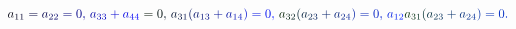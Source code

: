 \documentclass[12pt]{article}
\begin{document}
\makeatletter
\renewcommand*{\@textcolor}[3]{%
  \protect\leavevmode
  \begingroup
    \color#1{#2}#3%
  \endgroup
}
\makeatother
\begin{displaymath}
\mathcolor[RGB]{0,0,15}{a} _ { \mathcolor[RGB]{0,0,30}{1} \mathcolor[RGB]{0,0,45}{1} } \mathcolor[RGB]{0,0,60}{=} \mathcolor[RGB]{0,0,75}{a} _ { \mathcolor[RGB]{0,0,90}{2} \mathcolor[RGB]{0,0,105}{2} } \mathcolor[RGB]{0,0,120}{=} \mathcolor[RGB]{0,0,135}{0} \mathcolor[RGB]{0,0,150}{,} \mathcolor[RGB]{0,0,165}{\,
a} _ { \mathcolor[RGB]{0,0,180}{3} \mathcolor[RGB]{0,0,195}{3} } \mathcolor[RGB]{0,0,210}{+} \mathcolor[RGB]{0,0,225}{a} _ { \mathcolor[RGB]{0,0,240}{4} \mathcolor[RGB]{0,0,255}{4} } \mathcolor[RGB]{0,15,0}{=} \mathcolor[RGB]{0,15,15}{0} \mathcolor[RGB]{0,15,30}{,} \mathcolor[RGB]{0,15,45}{\,
a} _ { \mathcolor[RGB]{0,15,60}{3} \mathcolor[RGB]{0,15,75}{1} } \mathcolor[RGB]{0,15,90}{(} \mathcolor[RGB]{0,15,105}{a} _ { \mathcolor[RGB]{0,15,120}{1} \mathcolor[RGB]{0,15,135}{3} } \mathcolor[RGB]{0,15,150}{+} \mathcolor[RGB]{0,15,165}{a} _ { \mathcolor[RGB]{0,15,180}{1} \mathcolor[RGB]{0,15,195}{4} } \mathcolor[RGB]{0,15,210}{)} \mathcolor[RGB]{0,15,225}{=} \mathcolor[RGB]{0,15,240}{0} \mathcolor[RGB]{0,15,255}{,} \mathcolor[RGB]{0,30,0}{\,
a} _ { \mathcolor[RGB]{0,30,15}{3} \mathcolor[RGB]{0,30,30}{2} } \mathcolor[RGB]{0,30,45}{(} \mathcolor[RGB]{0,30,60}{a} _ { \mathcolor[RGB]{0,30,75}{2} \mathcolor[RGB]{0,30,90}{3} } \mathcolor[RGB]{0,30,105}{+} \mathcolor[RGB]{0,30,120}{a} _ { \mathcolor[RGB]{0,30,135}{2} \mathcolor[RGB]{0,30,150}{4} } \mathcolor[RGB]{0,30,165}{)} \mathcolor[RGB]{0,30,180}{=} \mathcolor[RGB]{0,30,195}{0} \mathcolor[RGB]{0,30,210}{,} \mathcolor[RGB]{0,30,225}{\,
a} _ { \mathcolor[RGB]{0,30,240}{1} \mathcolor[RGB]{0,30,255}{2} } \mathcolor[RGB]{0,45,0}{a} _ { \mathcolor[RGB]{0,45,15}{3} \mathcolor[RGB]{0,45,30}{1} } \mathcolor[RGB]{0,45,45}{(} \mathcolor[RGB]{0,45,60}{a} _ { \mathcolor[RGB]{0,45,75}{2} \mathcolor[RGB]{0,45,90}{3} } \mathcolor[RGB]{0,45,105}{+} \mathcolor[RGB]{0,45,120}{a} _ { \mathcolor[RGB]{0,45,135}{2} \mathcolor[RGB]{0,45,150}{4} } \mathcolor[RGB]{0,45,165}{)} \mathcolor[RGB]{0,45,180}{=} \mathcolor[RGB]{0,45,195}{0} \mathcolor[RGB]{0,45,210}{.}
\end{displaymath}
\end{document}
